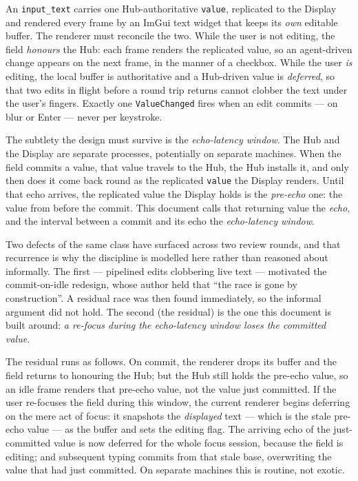 \documentclass[a4paper,10pt,fleqn]{article}
\begin{document}
An \texttt{input\_text} carries one Hub-authoritative \texttt{value}, replicated
to the Display and rendered every frame by an ImGui text widget that keeps its
\emph{own} editable buffer.  The renderer must reconcile the two.  While the
user is not editing, the field \emph{honours} the Hub: each frame renders the
replicated value, so an agent-driven change appears on the next frame, in the
manner of a checkbox.  While the user \emph{is} editing, the local buffer is
authoritative and a Hub-driven value is \emph{deferred}, so that two edits in
flight before a round trip returns cannot clobber the text under the user's
fingers.  Exactly one \texttt{ValueChanged} fires when an edit commits --- on
blur or Enter --- never per keystroke.

The subtlety the design must survive is the \emph{echo-latency window}.  The
Hub and the Display are separate processes, potentially on separate machines.
When the field commits a value, that value travels to the Hub, the Hub installs
it, and only then does it come back round as the replicated \texttt{value} the
Display renders.  Until that echo arrives, the replicated value the Display
holds is the \emph{pre-echo} one: the value from before the commit.  This
document calls that returning value the \emph{echo}, and the interval between a
commit and its echo the \emph{echo-latency window}.

Two defects of the same class have surfaced across two review rounds, and that
recurrence is why the discipline is modelled here rather than reasoned about
informally.  The first --- pipelined edits clobbering live text --- motivated
the commit-on-idle redesign, whose author held that ``the race is gone by
construction''.  A residual race was then found immediately, so the informal
argument did not hold.  The second (the residual) is the one this document is
built around: \emph{a re-focus during the echo-latency window loses the
committed value}.

The residual runs as follows.  On commit, the renderer drops its buffer and the
field returns to honouring the Hub; but the Hub still holds the pre-echo value,
so an idle frame renders that pre-echo value, not the value just committed.  If
the user re-focuses the field during this window, the current renderer begins
deferring on the mere act of focus: it snapshots the \emph{displayed} text ---
which is the stale pre-echo value --- as the buffer and sets the editing flag.
The arriving echo of the just-committed value is now deferred for the whole
focus session, because the field is editing; and subsequent typing commits from
that stale base, overwriting the value that had just committed.  On separate
machines this is routine, not exotic.
\end{document}
